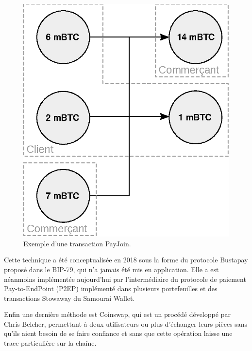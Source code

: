 \begin{figure}[ht]
  \centering
  \includegraphics[scale=0.75]{img/payjoin-transaction-3i-2o.eps}
  \caption{Exemple d'une transaction PayJoin.}
  \label{fig:payjoin-transaction}
\end{figure}

Cette technique a été conceptualisée en 2018 sous la forme du protocole Bustapay proposé dans le BIP-79, qui n'a jamais été mis en application. Elle a est néanmoins implémentée aujourd'hui par l'intermédiaire du protocole de paiement Pay-to-EndPoint (P2EP) implémenté dans plusieurs portefeuilles et des transactions Stowaway du Samourai Wallet.

Enfin une dernière méthode est Coinswap, qui est un procédé développé par Chris Belcher, permettant à deux utilisateurs ou plus d'échanger leurs pièces sans qu'ils aient besoin de se faire confiance et sans que cette opération laisse une trace particulière sur la chaîne.

